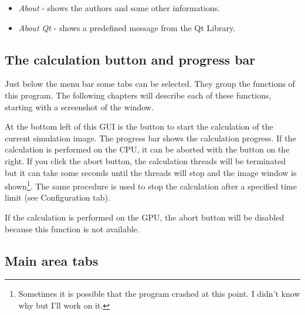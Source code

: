 \documentclass[11pt]{article} %
\begin{document}
\begin{itemize}\itemsep0pt
\item {\it About} - shows the authors and some other informations.
\item {\it About Qt} - shows a predefined message from the Qt Library.
\end{itemize}


\subsection{The calculation button and progress bar}

Just below the menu bar some tabs can be selected. They group the functions of this program. The following chapters will describe each of these functions, starting with a screenshot of the window.

At the bottom left of this GUI is the button to start the calculation of the current simulation image. The progress bar shows the calculation progress. If the calculation is performed on the CPU, it can be aborted with the button on the right. If you click the abort button, the calculation threads will be terminated but it can take some seconds until the threads will stop and the image window is shown\footnote{Sometimes it is possible that the program crashed at this point. I didn't know why but I'll work on it.}. The same procedure is used to stop the calculation after a specified time limit (see Configuration tab).

If the calculation is performed on the GPU, the abort button will be disabled because this function is not available.


\clearpage
\subsection{Main area tabs}
\end{document}

